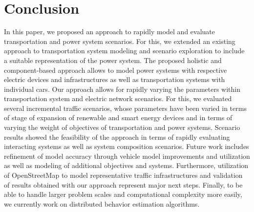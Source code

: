 \section{Conclusion}
\label{section:conclusion}

In this paper, we proposed an approach to rapidly model and evaluate transportation and power system scenarios. For this, we extended an existing approach to transportation system modeling and scenario exploration to include a suitable representation of the power system.
The proposed holistic and component-based approach allows to model power systems with respective electric devices and infrastructures as well as transportation systems with individual cars. Our approach allows for rapidly varying the parameters within transportation system and electric network scenarios. For this, we evaluated several incremental traffic scenarios, whose parameters have been varied in terms of stage of expansion of renewable and smart energy devices and in terms of varying the weight of objectives of transportation and power systems. Scenario results showed the feasibility of the approach in terms of rapidly evaluating interacting systems as well as system composition scenarios.
Future work includes refinement of model accuracy through vehicle model improvements and utilization as well as modeling of additional objectives and systems. Furthermore, utilization of OpenStreetMap to model representative traffic infrastructures and validation of results obtained with our approach represent major next steps. Finally, to be able to handle larger problem scales and computational complexity more easily, we currently work on distributed behavior estimation algorithms.

